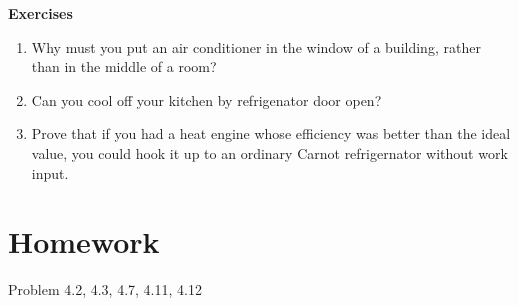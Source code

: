 \documentclass[twoside]{article}
\begin{document}
{\bf Exercises}\\
\begin{enumerate}
\item Why must you put an air conditioner in the window of a building, rather than in the middle of a room?
\item Can you cool off your kitchen by refrigenator door open?
\item Prove that if you had a heat engine whose efficiency was better than the ideal value, you could hook it up to an ordinary Carnot refrigernator without work input.
\end{enumerate}

\section{Homework}
Problem 4.2, 4.3, 4.7, 4.11, 4.12
\end{document}
